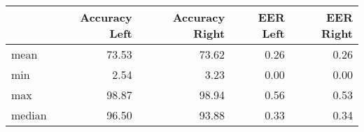 \begin{tabular}{lrrrr}
\toprule
{} &  Accuracy Left &  Accuracy Right &  EER Left &  EER Right \\
\midrule
mean   &          73.53 &           73.62 &      0.26 &       0.26 \\
min    &           2.54 &            3.23 &      0.00 &       0.00 \\
max    &          98.87 &           98.94 &      0.56 &       0.53 \\
median &          96.50 &           93.88 &      0.33 &       0.34 \\
\bottomrule
\end{tabular}
